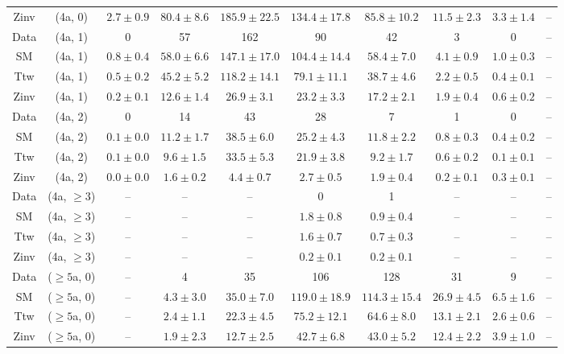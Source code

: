 \begin{table}[h!]
{\begin{tabular}{cccccccccc}
	Zinv & (4a, 0) & $2.7\pm 0.9$ & $80.4\pm 8.6$ & $185.9\pm 22.5$ & $134.4\pm 17.8$ & $85.8\pm 10.2$ & $11.5\pm 2.3$ & $3.3\pm 1.4$ & -- \\[0.5ex] 
	Data & (4a, 1) & 0 & 57 & 162 & 90 & 42 & 3 & 0 & -- \\[0.5ex] 
	SM & (4a, 1) & $0.8\pm 0.4$ & $58.0\pm 6.6$ & $147.1\pm 17.0$ & $104.4\pm 14.4$ & $58.4\pm 7.0$ & $4.1\pm 0.9$ & $1.0\pm 0.3$ & -- \\[0.5ex] 
	Ttw & (4a, 1) & $0.5\pm 0.2$ & $45.2\pm 5.2$ & $118.2\pm 14.1$ & $79.1\pm 11.1$ & $38.7\pm 4.6$ & $2.2\pm 0.5$ & $0.4\pm 0.1$ & -- \\[0.5ex] 
	Zinv & (4a, 1) & $0.2\pm 0.1$ & $12.6\pm 1.4$ & $26.9\pm 3.1$ & $23.2\pm 3.3$ & $17.2\pm 2.1$ & $1.9\pm 0.4$ & $0.6\pm 0.2$ & -- \\[0.5ex] 
	Data & (4a, 2) & 0 & 14 & 43 & 28 & 7 & 1 & 0 & -- \\[0.5ex] 
	SM & (4a, 2) & $0.1\pm 0.0$ & $11.2\pm 1.7$ & $38.5\pm 6.0$ & $25.2\pm 4.3$ & $11.8\pm 2.2$ & $0.8\pm 0.3$ & $0.4\pm 0.2$ & -- \\[0.5ex] 
	Ttw & (4a, 2) & $0.1\pm 0.0$ & $9.6\pm 1.5$ & $33.5\pm 5.3$ & $21.9\pm 3.8$ & $9.2\pm 1.7$ & $0.6\pm 0.2$ & $0.1\pm 0.1$ & -- \\[0.5ex] 
	Zinv & (4a, 2) & $0.0\pm 0.0$ & $1.6\pm 0.2$ & $4.4\pm 0.7$ & $2.7\pm 0.5$ & $1.9\pm 0.4$ & $0.2\pm 0.1$ & $0.3\pm 0.1$ & -- \\[0.5ex] 
	Data & (4a, $\ge3$) & -- & -- & -- & 0 & 1 & -- & -- & -- \\[0.5ex] 
	SM & (4a, $\ge3$) & -- & -- & -- & $1.8\pm 0.8$ & $0.9\pm 0.4$ & -- & -- & -- \\[0.5ex] 
	Ttw & (4a, $\ge3$) & -- & -- & -- & $1.6\pm 0.7$ & $0.7\pm 0.3$ & -- & -- & -- \\[0.5ex] 
	Zinv & (4a, $\ge3$) & -- & -- & -- & $0.2\pm 0.1$ & $0.2\pm 0.1$ & -- & -- & -- \\[0.5ex] 
	Data & ($\ge5$a, 0) & -- & 4 & 35 & 106 & 128 & 31 & 9 & -- \\[0.5ex] 
	SM & ($\ge5$a, 0) & -- & $4.3\pm 3.0$ & $35.0\pm 7.0$ & $119.0\pm 18.9$ & $114.3\pm 15.4$ & $26.9\pm 4.5$ & $6.5\pm 1.6$ & -- \\[0.5ex] 
	Ttw & ($\ge5$a, 0) & -- & $2.4\pm 1.1$ & $22.3\pm 4.5$ & $75.2\pm 12.1$ & $64.6\pm 8.0$ & $13.1\pm 2.1$ & $2.6\pm 0.6$ & -- \\[0.5ex] 
	Zinv & ($\ge5$a, 0) & -- & $1.9\pm 2.3$ & $12.7\pm 2.5$ & $42.7\pm 6.8$ & $43.0\pm 5.2$ & $12.4\pm 2.2$ & $3.9\pm 1.0$ & -- \\[0.5ex] 

\end{tabular}}
\end{table}
